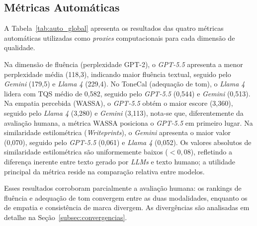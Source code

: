 \documentclass[12pt, a4paper]{article}
\numberwithin{equation}{section}
\begin{document}
\subsection{Métricas Automáticas}
\label{subsec:metricas_automaticas}

A Tabela~\ref{tab:auto_global} apresenta os resultados das quatro métricas automáticas utilizadas como \textit{proxies} computacionais para cada dimensão de qualidade.

\begin{table}[H]
\centering
\caption{Métricas Automáticas Globais por Modelo}
\label{tab:auto_global}
\end{table}

Na dimensão de fluência (perplexidade GPT-2), o \textit{GPT-5.5} apresenta a menor perplexidade média (118,3), indicando maior fluência textual, seguido pelo \textit{Gemini} (179,5) e \textit{Llama 4} (229,4). No ToneCal (adequação de tom), o \textit{Llama 4} lidera com TQS médio de 0,582, seguido pelo \textit{GPT-5.5} (0,544) e \textit{Gemini} (0,513). Na empatia percebida (WASSA), o \textit{GPT-5.5} obtém o maior escore (3,360), seguido pelo \textit{Llama 4} (3,280) e \textit{Gemini} (3,113), nota-se que, diferentemente da avaliação humana, a métrica WASSA posiciona o \textit{GPT-5.5} em primeiro lugar. Na similaridade estilométrica (\textit{Writeprints}), o \textit{Gemini} apresenta o maior valor (0,070), seguido pelo \textit{GPT-5.5} (0,061) e \textit{Llama 4} (0,052). Os valores absolutos de similaridade estilométrica são uniformemente baixos ($< 0{,}08$), refletindo a diferença inerente entre texto gerado por \textit{LLMs} e texto humano; a utilidade principal da métrica reside na comparação relativa entre modelos.

Esses resultados corroboram parcialmente a avaliação humana: os rankings de fluência e adequação de tom convergem entre as duas modalidades, enquanto os de empatia e consistência de marca divergem. As divergências são analisadas em detalhe na Seção~\ref{subsec:convergencias}.
\end{document}
